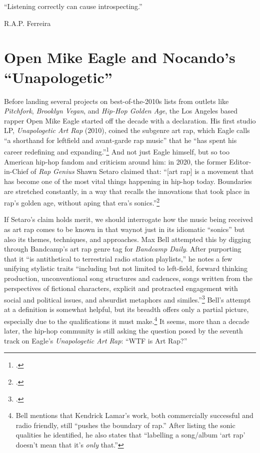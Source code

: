 \onehalfspacing
\label{chapter1}
\epigraph{{``Listening correctly can cause introspecting.''}}{R.A.P. Ferreira}

\section{Open Mike Eagle and Nocando's ``Unapologetic''}

Before landing several projects on best-of-the-2010s lists from outlets like \textit{Pitchfork},
\textit{Brooklyn Vegan}, and \textit{Hip-Hop Golden Age}, the Los Angeles based rapper Open Mike
Eagle started off the decade with a declaration. His first studio LP, \textit{Unapologetic Art Rap} 
(2010), coined the subgenre art rap, which Eagle calls ``a shorthand for leftfield and avant-garde
rap music'' that he ``has spent his career redefining and expanding.''\footnote{
    \cite{openmikeeagle}.}
And not just Eagle himself, but so too American hip-hop fandom and criticism around him: in 2020,
the former Editor-in-Chief of \textit{Rap Genius} Shawn Setaro claimed that: ``[art rap] is a 
movement that has become one of the most vital things happening in hip-hop today. Boundaries are
stretched constantly, in a way that recalls the innovations that took place in rap's golden age, 
without aping that era's  sonics.''\footnote{
    \cite{shawnsetaroWhyYouShould2020}.}

If Setaro's claim holds merit, we should interrogate how the music being received as art rap comes
to be known in that way\textemdash not just in its idiomatic ``sonics'' but also its themes,
techniques, and approaches. Max Bell attempted this by digging through Bandcamp's art rap genre
tag for \textit{Bandcamp  Daily}. After purporting that it ``is antithetical to terrestrial radio 
station playlists,'' he notes a few unifying stylistic traits ``including but not limited to 
left-field, forward thinking production, unconventional song structures and cadences, songs written
from the perspectives of fictional characters, explicit and protracted engagement with social and 
political issues, and absurdist metaphors and similes.''\footnote{
    \cite{maxbellWalkAvantGardeWorld2017}.} 
Bell's attempt at a definition is somewhat helpful, but its breadth offers only a partial picture, 
especially due to the qualifications it must make.\footnote{
    Bell mentions that Kendrick Lamar's work, both commercially successful and radio friendly,
    still ``pushes the boundary of rap.'' After listing the sonic qualities he identified, he
    also states that ``labelling a song/album `art rap' doesn't mean that it's \textit{only}
    that.''} 
It seems, more than a decade later, the hip-hop community is still asking the question posed by
the seventh track on Eagle's \textit{Unapologetic Art Rap}: ``WTF is Art Rap?''

